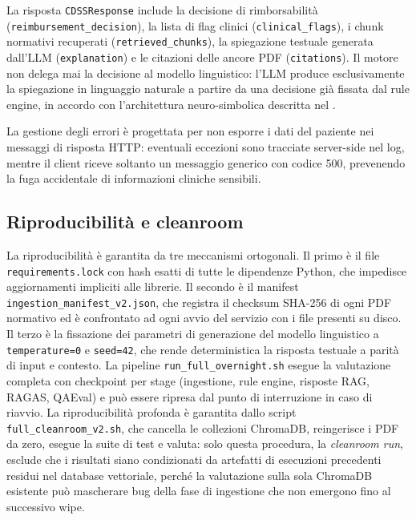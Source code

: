 La risposta \texttt{CDSSResponse} include la decisione di rimborsabilità
(\texttt{reimbursement\_decision}), la lista di flag clinici
(\texttt{clinical\_flags}), i chunk normativi recuperati
(\texttt{retrieved\_chunks}), la spiegazione testuale generata dall'LLM
(\texttt{explanation}) e le citazioni delle ancore PDF
(\texttt{citations}). Il motore non delega mai la decisione al modello
linguistico: l'LLM produce esclusivamente la spiegazione in linguaggio naturale
a partire da una decisione già fissata dal rule engine, in accordo con
l'architettura neuro-simbolica descritta nel .

La gestione degli errori è progettata per non esporre i dati del paziente
nei messaggi di risposta HTTP: eventuali eccezioni sono tracciate server-side
nel log, mentre il client riceve soltanto un messaggio generico con codice
500, prevenendo la fuga accidentale di informazioni cliniche sensibili.

\subsection{Riproducibilità e cleanroom}
\label{subsec:reproducibility-impl}

La riproducibilità è garantita da tre meccanismi ortogonali. Il primo è il
file \texttt{requirements.lock} con hash esatti di tutte le dipendenze Python,
che impedisce aggiornamenti impliciti alle librerie. Il secondo è il manifest
\texttt{ingestion\_manifest\_v2.json}, che registra il checksum SHA-256 di
ogni PDF normativo ed è confrontato ad ogni avvio del servizio con i file
presenti su disco. Il terzo è la fissazione dei parametri di generazione del
modello linguistico a \texttt{temperature=0} e \texttt{seed=42}, che rende
deterministica la risposta testuale a parità di input e contesto. La pipeline
\texttt{run\_full\_overnight.sh} esegue la valutazione completa con
checkpoint per stage (ingestione, rule engine, risposte RAG, RAGAS,
QAEval) e può essere ripresa dal punto di interruzione in caso di riavvio.
La riproducibilità profonda è garantita dallo script
\texttt{full\_cleanroom\_v2.sh}, che cancella le collezioni ChromaDB,
reingerisce i PDF da zero, esegue la suite di test e valuta: solo questa
procedura, la \emph{cleanroom run}, esclude che i risultati siano
condizionati da artefatti di esecuzioni precedenti residui nel database
vettoriale, perché la valutazione sulla sola ChromaDB esistente può mascherare
bug della fase di ingestione che non emergono fino al successivo wipe.

